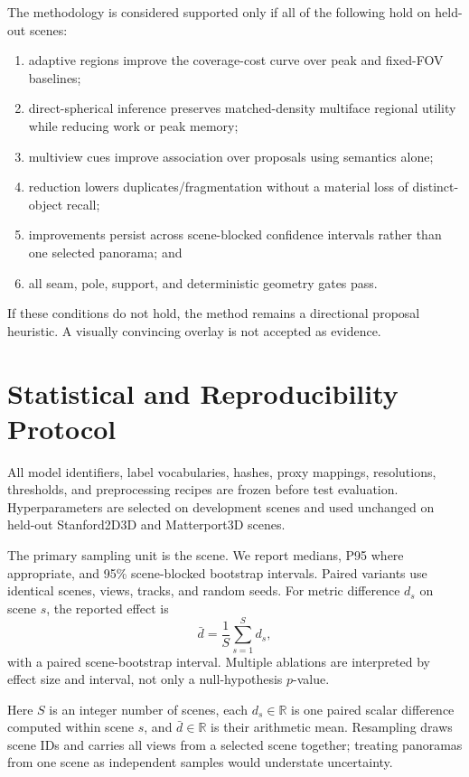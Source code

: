 \documentclass[a4paper,9pt]{extarticle}
\newcommand{\R}{\mathbb R}
\begin{document}
The methodology is considered supported only if all of the following hold on held-out scenes:
\begin{enumerate}
 \item adaptive regions improve the coverage-cost curve over peak and fixed-FOV baselines;
 \item direct-spherical inference preserves matched-density multiface regional utility while reducing work or peak memory;
 \item multiview cues improve association over proposals using semantics alone;
 \item reduction lowers duplicates/fragmentation without a material loss of distinct-object recall;
 \item improvements persist across scene-blocked confidence intervals rather than one selected panorama; and
 \item all seam, pole, support, and deterministic geometry gates pass.
\end{enumerate}
If these conditions do not hold, the method remains a directional proposal heuristic. A visually convincing overlay is not accepted as evidence.

\section{Statistical and Reproducibility Protocol}

All model identifiers, label vocabularies, hashes, proxy mappings, resolutions, thresholds, and preprocessing recipes are frozen before test evaluation. Hyperparameters are selected on development scenes and used unchanged on held-out Stanford2D3D and Matterport3D scenes.

The primary sampling unit is the scene. We report medians, P95 where appropriate, and 95\% scene-blocked bootstrap intervals. Paired variants use identical scenes, views, tracks, and random seeds. For metric difference $d_s$ on scene $s$, the reported effect is
\begin{equation}
 \bar d=\frac{1}{S}\sum_{s=1}^{S}d_s,
 \label{eq:effect}
\end{equation}
with a paired scene-bootstrap interval. Multiple ablations are interpreted by effect size and interval, not only a null-hypothesis $p$-value.

Here $S$ is an integer number of scenes, each $d_s\in\R$ is one paired scalar
difference computed within scene $s$, and $\bar d\in\R$ is their arithmetic
mean. Resampling draws scene IDs and carries all views from a selected scene
together; treating panoramas from one scene as independent samples would
understate uncertainty.
\end{document}
